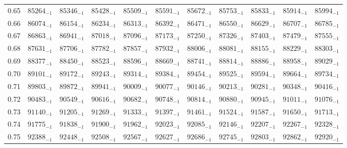 \documentclass[10pt, a4paper]{article}
\begin{document}
\begin{center}
\begin{longtable}{c || c c c c c | c c c c c}
        0.65 & \({85264}_{-1}\) & \({85346}_{-1}\) & \({85428}_{-1}\) & \({85509}_{-1}\) & \({85591}_{-1}\) & \({85672}_{-1}\) & \({85753}_{-1}\) & \({85833}_{-1}\) & \({85914}_{-1}\) & \({85994}_{-1}\)\\
        0.66 & \({86074}_{-1}\) & \({86154}_{-1}\) & \({86234}_{-1}\) & \({86313}_{-1}\) & \({86392}_{-1}\) & \({86471}_{-1}\) & \({86550}_{-1}\) & \({86629}_{-1}\) & \({86707}_{-1}\) & \({86785}_{-1}\)\\
        0.67 & \({86863}_{-1}\) & \({86941}_{-1}\) & \({87018}_{-1}\) & \({87096}_{-1}\) & \({87173}_{-1}\) & \({87250}_{-1}\) & \({87326}_{-1}\) & \({87403}_{-1}\) & \({87479}_{-1}\) & \({87555}_{-1}\)\\
        0.68 & \({87631}_{-1}\) & \({87706}_{-1}\) & \({87782}_{-1}\) & \({87857}_{-1}\) & \({87932}_{-1}\) & \({88006}_{-1}\) & \({88081}_{-1}\) & \({88155}_{-1}\) & \({88229}_{-1}\) & \({88303}_{-1}\)\\
        0.69 & \({88377}_{-1}\) & \({88450}_{-1}\) & \({88523}_{-1}\) & \({88596}_{-1}\) & \({88669}_{-1}\) & \({88741}_{-1}\) & \({88814}_{-1}\) & \({88886}_{-1}\) & \({88958}_{-1}\) & \({89029}_{-1}\)\\
        \hline
        0.70 & \({89101}_{-1}\) & \({89172}_{-1}\) & \({89243}_{-1}\) & \({89314}_{-1}\) & \({89384}_{-1}\) & \({89454}_{-1}\) & \({89525}_{-1}\) & \({89594}_{-1}\) & \({89664}_{-1}\) & \({89734}_{-1}\)\\
        0.71 & \({89803}_{-1}\) & \({89872}_{-1}\) & \({89941}_{-1}\) & \({90009}_{-1}\) & \({90077}_{-1}\) & \({90146}_{-1}\) & \({90213}_{-1}\) & \({90281}_{-1}\) & \({90348}_{-1}\) & \({90416}_{-1}\)\\
        0.72 & \({90483}_{-1}\) & \({90549}_{-1}\) & \({90616}_{-1}\) & \({90682}_{-1}\) & \({90748}_{-1}\) & \({90814}_{-1}\) & \({90880}_{-1}\) & \({90945}_{-1}\) & \({91011}_{-1}\) & \({91076}_{-1}\)\\
        0.73 & \({91140}_{-1}\) & \({91205}_{-1}\) & \({91269}_{-1}\) & \({91333}_{-1}\) & \({91397}_{-1}\) & \({91461}_{-1}\) & \({91524}_{-1}\) & \({91587}_{-1}\) & \({91650}_{-1}\) & \({91713}_{-1}\)\\
        0.74 & \({91775}_{-1}\) & \({91838}_{-1}\) & \({91900}_{-1}\) & \({91962}_{-1}\) & \({92023}_{-1}\) & \({92085}_{-1}\) & \({92146}_{-1}\) & \({92207}_{-1}\) & \({92267}_{-1}\) & \({92328}_{-1}\)\\
        0.75 & \({92388}_{-1}\) & \({92448}_{-1}\) & \({92508}_{-1}\) & \({92567}_{-1}\) & \({92627}_{-1}\) & \({92686}_{-1}\) & \({92745}_{-1}\) & \({92803}_{-1}\) & \({92862}_{-1}\) & \({92920}_{-1}\)\\

\end{longtable}
\end{center}
\end{document}

